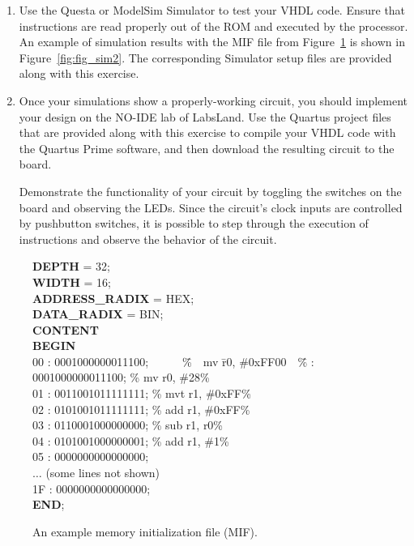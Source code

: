 \documentclass[epsfig,10pt,fullpage]{article} \addtolength{\textwidth}{1.5in}
\begin{document}
\begin{enumerate}
\item Use the Questa or ModelSim Simulator to test your VHDL code. Ensure 
that instructions are read properly out of the ROM and executed by the processor. An example 
of simulation results with the MIF file from 
Figure~\ref{fig:fig_MIF} is shown in Figure~\ref{fig:fig_sim2}. The corresponding Simulator 
setup files are provided along with this exercise.
\item Once your simulations show a properly-working circuit, you should implement
your design on the NO-IDE lab of LabsLand. Use the Quartus project files that are 
provided along with this exercise to compile your VHDL code with the Quartus Prime 
software, and then download the resulting circuit to the board.

Demonstrate the functionality of your circuit by
toggling the switches on the board and observing the LEDs. Since the circuit's clock inputs 
are controlled by pushbutton switches, it is possible to step through the execution of 
instructions and observe the behavior of the circuit.
\end{enumerate}

\begin{figure}[H]
\begin{center}
\begin{minipage}[t]{12.5 cm}
\begin{tabbing}
{\bf DEPTH} = 32;\\
{\bf WIDTH} = 16;\\
{\bf ADDRESS\_RADIX} = HEX;\\
{\bf DATA\_RADIX} = BIN;\\
{\bf CONTENT}\\
{\bf BEGIN}\\
00	:	0001000000011100;~~~~~~\=\%~~mv  \=r0, \#0xFF00~~\=\% 	:	0001000000011100;	\>\% mv \>r0, \#28\>\%\\
01	:	0011001011111111; \>\% mvt \>r1, \#0xFF\>\%\\
02	:	0101001011111111;	\>\% add  \>r1, \#0xFF\>\%\\
03	:	0110001000000000;	\>\% sub  \>r1, r0\>\%\\
04	:	0101001000000001;	\>\% add  \>r1, \#1\>\%\\
05	:	0000000000000000;\\
$\ldots$ (some lines not shown)\\
1F :	0000000000000000;\\
{\bf END};
\end{tabbing}
\end{minipage}
\end{center}
\caption{An example memory initialization file (MIF).}
\label{fig:fig_MIF}
\end{figure}
\end{document}
